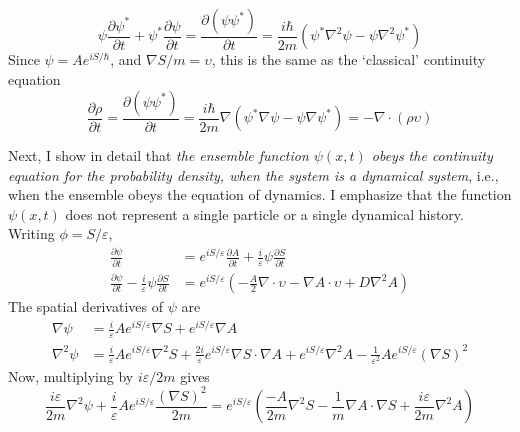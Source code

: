 \begin{equation*}
\psi\frac{\partial\psi^*}{\partial t} + \psi^*\frac{\partial\psi}{\partial t}=\frac{\partial(\psi\psi^*)}{\partial t}=
\frac{i\hbar}{2m} \left(\psi^*\nabla^2\psi-\psi\nabla^2\psi^*\right)\tag{13}\label{c14-eq13}
\end{equation*}
Since $\psi=Ae^{iS/\hbar}$, and $\nabla S/m=\upsilon$, this is the same as the `classical' continuity equation
\begin{equation*}
\frac{\partial\rho}{\partial t} = \frac{\partial(\psi\psi^*)}{\partial t}=\frac{i\hbar}{2m} \nabla (\psi^*\nabla\psi-\psi\nabla\psi^*) = -\nabla\cdot(\rho\upsilon)\tag{14}\label{c14-eq14}
\end{equation*}

Next, I show in detail that \textit{the ensemble function $\psi(x, t)$ obeys the continuity equation
for the probability density, when the system is a dynamical system}, i.e., when the ensemble
obeys the equation of dynamics. I emphasize that the function $\psi(x, t)$ does not represent a
single particle or a single dynamical history. Writing $\phi = S/\varepsilon$,
\begin{align}
\frac{\partial\psi}{\partial t} &= e^{iS/\varepsilon}\frac{\partial A}{\partial t} + \frac{i}{\varepsilon}\psi\frac{\partial S}{\partial t}\nonumber\\
\frac{\partial\psi}{\partial t}-\frac{i}{\varepsilon}\psi\frac{\partial S}{\partial t}&=e^{iS/\varepsilon}\left(-\frac{A}{2}\nabla\cdot \upsilon-\nabla A\cdot \upsilon+D\nabla^2A\right)\tag{15}\label{c14-eq15}
\end{align}
The spatial derivatives of $\psi$ are
\eject
\begin{align}
\nabla\psi &= \frac{i}{\varepsilon} Ae^{iS/\varepsilon}\nabla S + e^{iS/\varepsilon}\nabla A\nonumber\\
\nabla^2\psi &= \frac{i}{\varepsilon} Ae^{iS/\varepsilon}\nabla^2 S + \frac{2i}{\varepsilon}e^{iS/\varepsilon}\nabla S\cdot \nabla A + 
e^{iS/\varepsilon}\nabla^2 A - \frac{1}{\varepsilon^2} Ae^{iS/\varepsilon}(\nabla S)^2\tag{16}\label{c14-eq16}
\end{align}
Now, multiplying by $i\varepsilon /2m$ gives
\begin{equation*}
\frac{i\varepsilon}{2m} \nabla^2 \psi + \frac{i}{\varepsilon} A e^{iS/\varepsilon} \frac{(\nabla S)^2}{2m} = e^{iS/\varepsilon} \left(\frac{-A}{2m} \nabla^2 S - \frac{1}{m} \nabla A \cdot \nabla S + \frac{i\varepsilon}{2m} \nabla^2 A \right) \tag{17}\label{c14-eq17}
\end{equation*}

